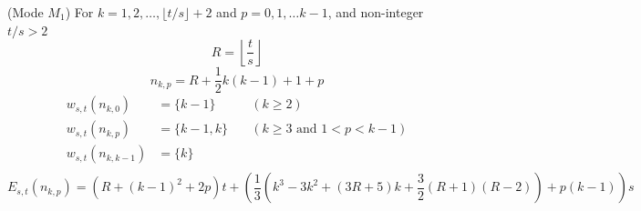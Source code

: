 \documentclass[]{article}
\begin{document}
\hspace{1cm}
\begin{lemma} 
	(Mode $M_1$)  For $k = 1,2,\dots,\lfloor t/s\rfloor + 2$ and  $p = 0, 1, \dots k - 1$, and non-integer $t/s > 2$
	\[
		R = \left\lfloor\frac{t}{s}\right\rfloor
	\]
	\[
		n_{k,p} = R + \frac{1}{2}k(k-1) + 1 + p
	\]
	\begin{align*}
	    w_{s,t}(n_{k, 0}) &= \{k-1\} &\quad(k\geq 2)\\
	    w_{s,t}(n_{k, p}) &= \{k-1, k\}&\quad (k\geq 3 \text{ and } 1 <p<k-1)\\
	    w_{s,t}(n_{k, k-1}) &= \{k\}\\
	\end{align*}
	\[
	E_{s,t}(n_{k, p}) = \left(R+(k-1)^2+2p\right)t + \left( \frac{1}{3}(k^3-3k^2+(3R+5)k+\frac{3}{2}(R+1)(R-2)) + p(k-1) \right) s
	\]
\end{lemma}
\end{document}
